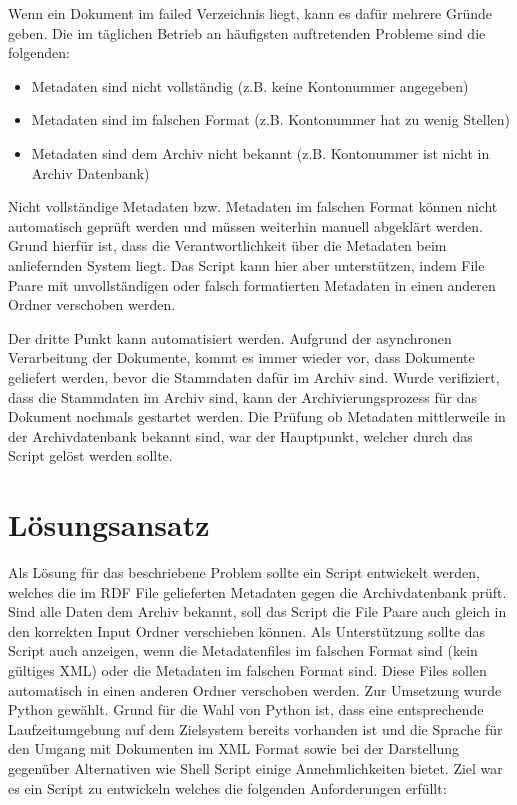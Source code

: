 \documentclass[a4paper,oneside, 12pt]{report}
\begin{document}
Wenn ein Dokument im failed Verzeichnis liegt, kann es dafür mehrere Gründe geben. Die im täglichen Betrieb an häufigsten auftretenden Probleme sind die folgenden:
\begin{itemize}\itemsep=0.5pt
  \item Metadaten sind nicht vollständig  (z.B. keine Kontonummer angegeben)
  \item Metadaten sind im falschen Format (z.B. Kontonummer hat zu wenig Stellen)
  \item Metadaten sind dem Archiv nicht bekannt (z.B. Kontonummer ist nicht in Archiv Datenbank)
\end{itemize}

Nicht vollständige Metadaten bzw. Metadaten im falschen Format können nicht automatisch geprüft werden und müssen weiterhin manuell abgeklärt werden. Grund hierfür ist, dass die Verantwortlichkeit über die Metadaten beim anliefernden System liegt. Das Script kann hier aber unterstützen, indem File Paare mit unvollständigen oder falsch formatierten Metadaten in einen anderen Ordner verschoben werden.

Der dritte Punkt kann automatisiert werden. Aufgrund der asynchronen Verarbeitung der Dokumente, kommt es immer wieder vor, dass Dokumente geliefert werden, bevor die Stammdaten dafür im Archiv sind. Wurde verifiziert, dass die Stammdaten im Archiv sind, kann der Archivierungsprozess für das Dokument nochmals gestartet werden. Die Prüfung ob Metadaten mittlerweile in der Archivdatenbank bekannt sind, war der Hauptpunkt, welcher durch das Script gelöst werden sollte.

\section{Lösungsansatz}
Als Lösung für das beschriebene Problem sollte ein Script entwickelt werden, welches die im \ac{RDF} File gelieferten Metadaten gegen die Archivdatenbank prüft. Sind alle Daten dem Archiv bekannt, soll das Script die File Paare auch gleich in den korrekten Input Ordner verschieben können. Als Unterstützung sollte das Script auch anzeigen, wenn die Metadatenfiles im falschen Format sind (kein gültiges XML) oder die Metadaten im falschen Format sind. Diese Files sollen automatisch in einen anderen Ordner verschoben werden. Zur Umsetzung wurde Python gewählt. Grund für die Wahl von Python ist, dass eine entsprechende Laufzeitumgebung auf dem Zielsystem bereits vorhanden ist und die Sprache für den Umgang mit Dokumenten im XML Format sowie bei der Darstellung gegenüber Alternativen wie Shell Script einige Annehmlichkeiten bietet. Ziel war es ein Script zu entwickeln welches die folgenden Anforderungen erfüllt:
\end{document}
